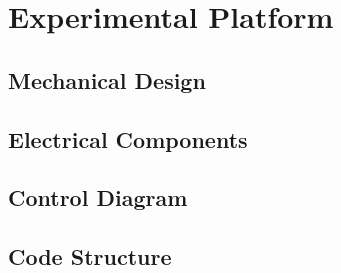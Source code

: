 \chapter{Experimental Platform}
\section{Mechanical Design}
\section{Electrical Components}
\section{Control Diagram}
\section{Code Structure}